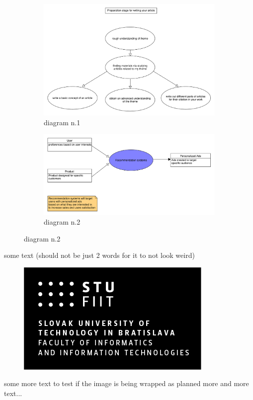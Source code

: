 \documentclass[10pt,twoside,english,a4paper]{article}
\begin{document}
\begin{figure}[H]
	\caption{UMLet diagrams}
	\label{fig:umletdiag}
	\begin{subfigure}[b]{0.5\textwidth}
		\centering
		\includegraphics[width=1\textwidth]{diagram_1.pdf}
		\caption{diagram n.1}
	\end{subfigure}
	\begin{subfigure}[b]{0.5\textwidth}
		\centering
		\includegraphics[width=1\textwidth]{diagram_2.pdf}
		\caption{diagram n.2}
	\end{subfigure}
\end{figure}

some text (should not be just 2 words for it to not look weird)
\begin{figure}
    \includegraphics[scale=0.3]{STU-FIIT-ancnv.png}
\end{figure}
some more text to test if the image is being wrapped as planned
\newline more and more text...
\end{document}
